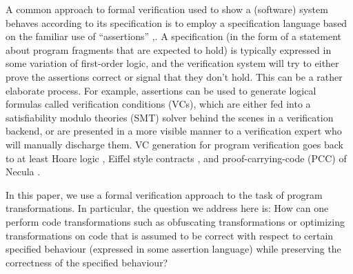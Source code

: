 \documentclass[compsoc,conference,a4paper,10pt,times]{IEEEtran}
\begin{document}
A common approach to formal verification used to show a (software) system behaves according to its specification is to employ a specification language based on the familiar use of ``assertions'' \cite{Floyd},\cite{Hoare}. A specification (in the form of a statement about program fragments that are expected to hold) is typically expressed in some variation of first-order logic, and the verification system will try to either prove the assertions correct or signal that they don't hold. This can be a rather elaborate process.  For example, assertions can be used to generate logical formulas called verification conditions (VCs), which are either fed into a satisfiability modulo theories (SMT) solver behind the scenes in a verification backend, or are presented in a more visible manner to a verification expert who will manually discharge them. VC generation for program verification goes back to at least Hoare logic \cite{Hoare}, Eiffel style contracts \cite{Eiffel}, and proof-carrying-code (PCC) of Necula \cite{b7}.

In this paper, we use a formal verification approach to the task of program transformations.
In particular, the question we address here is:
How can one perform code transformations such as obfuscating transformations or optimizing transformations on code that is assumed to be correct with respect to certain specified behaviour (expressed in some assertion language) while preserving the correctness of the specified behaviour?
\end{document}
